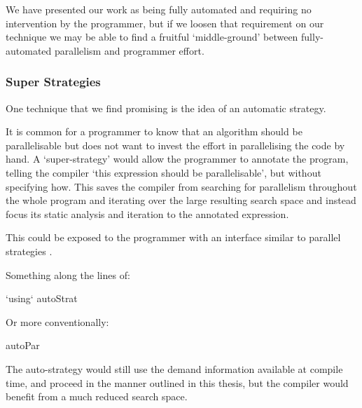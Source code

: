 We have presented our work as being fully automated and requiring no
intervention by the programmer, but if we loosen that requirement on
our technique we may be able to find a fruitful `middle-ground' between
fully-automated parallelism and programmer effort.

\subsubsection{Super Strategies}

One technique that we find promising is the idea of an automatic strategy.

It is common for a programmer to know that an algorithm should be
parallelisable but does not want to invest the effort in parallelising the code
by hand. A `super-strategy' would allow the programmer to annotate the program,
telling the compiler `this expression should be parallelisable', but without
specifying how. This saves the compiler from searching for parallelism
throughout the whole program and iterating over the large resulting search
space and instead focus its static analysis and iteration to the annotated
expression.

This could be exposed to the programmer with an interface similar to parallel
strategies \citep{strategies}.

Something along the lines of:

\begin{haskell}
 `using` autoStrat
\end{haskell}

Or more conventionally:

\begin{haskell}
autoPar 
\end{haskell}

The auto-strategy would still use the demand information available at compile
time, and proceed in the manner outlined in this thesis, but the compiler would
benefit from a much reduced search space.
